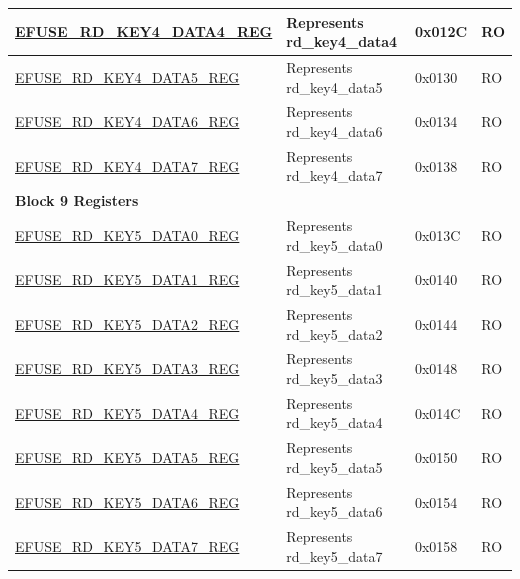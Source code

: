 \begin{longtable}{ | p{7cm} | p{6cm} | p{1.2cm} | p{1.5cm} | }
\hyperref[regdesc:EFUSERDKEY4DATANREG]{EFUSE\_RD\_KEY4\_DATA4\_REG} & Represents rd\_key4\_data4 & 0x012C & RO \\ \hline
\hyperref[regdesc:EFUSERDKEY4DATANREG]{EFUSE\_RD\_KEY4\_DATA5\_REG} & Represents rd\_key4\_data5 & 0x0130 & RO \\ \hline
\hyperref[regdesc:EFUSERDKEY4DATANREG]{EFUSE\_RD\_KEY4\_DATA6\_REG} & Represents rd\_key4\_data6 & 0x0134 & RO \\ \hline
\hyperref[regdesc:EFUSERDKEY4DATANREG]{EFUSE\_RD\_KEY4\_DATA7\_REG} & Represents rd\_key4\_data7 & 0x0138 & RO \\ \hline
\multicolumn{4}{|l|}{\textbf{Block 9 Registers}} \\ \hline
\hyperref[regdesc:EFUSERDKEY5DATANREG]{EFUSE\_RD\_KEY5\_DATA0\_REG} & Represents rd\_key5\_data0 & 0x013C & RO \\ \hline
\hyperref[regdesc:EFUSERDKEY5DATANREG]{EFUSE\_RD\_KEY5\_DATA1\_REG} & Represents rd\_key5\_data1 & 0x0140 & RO \\ \hline
\hyperref[regdesc:EFUSERDKEY5DATANREG]{EFUSE\_RD\_KEY5\_DATA2\_REG} & Represents rd\_key5\_data2 & 0x0144 & RO \\ \hline
\hyperref[regdesc:EFUSERDKEY5DATANREG]{EFUSE\_RD\_KEY5\_DATA3\_REG} & Represents rd\_key5\_data3 & 0x0148 & RO \\ \hline
\hyperref[regdesc:EFUSERDKEY5DATANREG]{EFUSE\_RD\_KEY5\_DATA4\_REG} & Represents rd\_key5\_data4 & 0x014C & RO \\ \hline
\hyperref[regdesc:EFUSERDKEY5DATANREG]{EFUSE\_RD\_KEY5\_DATA5\_REG} & Represents rd\_key5\_data5 & 0x0150 & RO \\ \hline
\hyperref[regdesc:EFUSERDKEY5DATANREG]{EFUSE\_RD\_KEY5\_DATA6\_REG} & Represents rd\_key5\_data6 & 0x0154 & RO \\ \hline
\hyperref[regdesc:EFUSERDKEY5DATANREG]{EFUSE\_RD\_KEY5\_DATA7\_REG} & Represents rd\_key5\_data7 & 0x0158 & RO \\ \hline


\end{longtable}
